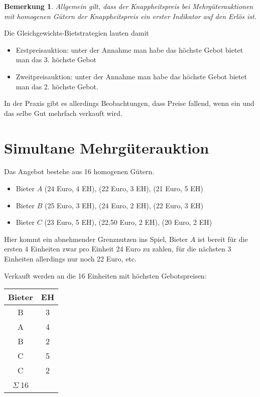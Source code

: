 \documentclass[12pt]{extreport} %
\theoremstyle{named}
\theoremstyle{nnamed}
\theoremstyle{itshape}
\theoremstyle{normal}
\newtheorem*{bemerkung}{Bemerkung}
\begin{document}
\begin{bemerkung}
	Allgemein gilt, dass der Knappheitspreis bei Mehrgüterauktionen mit homogenen Gütern der Knappheitspreis ein erster Indikator auf den Erlös ist.
\end{bemerkung}

Die Gleichgewichts-Bietstrategien lauten damit
\begin{itemize}
	\item Erstpreisauktion: unter der Annahme man habe das höchste Gebot bietet man das 3. höchste Gebot
	\item Zweitpreisauktion: unter der Annahme man habe das höchste Gebot bietet man das 2. höchste Gebot.
\end{itemize}

In der Praxis gibt es allerdings Beobachtungen, dass Preise fallend, wenn ein und das selbe Gut mehrfach verkauft wird. ~\newpage

\section{Simultane Mehrgüterauktion}

Das Angebot bestehe aus 16 homogenen Gütern.

\begin{itemize}
	\item Bieter $A$ (24 Euro, 4 EH), (22 Euro, 3 EH), (21 Euro, 5 EH)
	\item Bieter $B$ (25 Euro, 3 EH), (24 Euro, 2 EH), (22 Euro, 3 EH)
	\item Bieter $C$ (23 Euro, 5 EH), (22.50 Euro, 2 EH), (20 Euro, 2 EH)
\end{itemize}
Hier kommt ein abnehmender Grenznutzen ins Spiel, Bieter $A$ ist bereit für die ersten 4 Einheiten zwar pro Einheit 24 Euro zu zahlen, für die nächsten 3 Einheiten allerdings nur noch 22 Euro, etc.

Verkauft werden an die 16 Einheiten mit höchsten Gebotspreisen: ~
\begin{tabular}{c|c}
  Bieter & EH \\
  \hline
  B & 3 \\
  A & 4 \\
  B & 2 \\
  C & 5 \\
  C & 2 \\
  \hline
  $\Sigma ~$16 & ~
\end{tabular} ~\\
\end{document}
